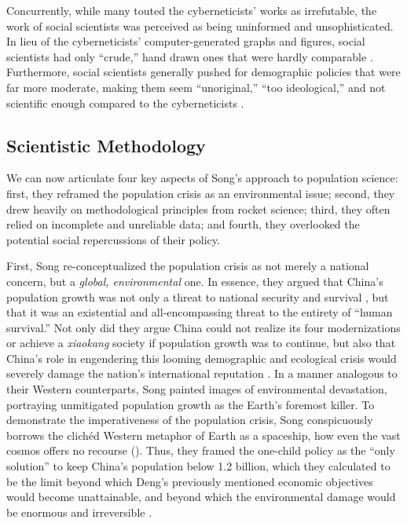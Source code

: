 Concurrently, while many touted the cyberneticists’ works as irrefutable, the work of social scientists was perceived as being uninformed and unsophisticated. In lieu of the cyberneticists’ computer-generated graphs and figures, social scientists had only “crude,” hand drawn ones that were hardly comparable \autocite[p.\ 209]{Greenhalgh2008JustOneChild}. Furthermore, social scientists generally pushed for demographic policies that were far more moderate, making them seem “unoriginal,” “too ideological,” and not scientific enough compared to the cyberneticists \autocite[p.\ 260]{Greenhalgh2008JustOneChild}. 

\subsection{Scientistic Methodology}

We can now articulate four key aspects of Song's approach to population science: first, they reframed the population crisis as an environmental issue; second, they drew heavily on methodological principles from rocket science; third, they often relied on incomplete and unreliable data; and fourth, they overlooked the potential social repercussions of their policy.

First, Song re-conceptualized the population crisis as not merely a national concern, but a \emph{global, environmental} one. In essence, they argued that China’s population growth was not only a threat to national security and survival \autocite[p.\ 153]{Greenhalgh2008JustOneChild}, but that it was an existential and all-encompassing threat to the entirety of “human survival.” Not only did they argue China could not realize its four modernizations or achieve a \emph{xiaokang} society if population growth was to continue, but also that China’s role in engendering this looming demographic and ecological crisis would severely damage the nation’s international reputation \autocite[p.\ 154]{Greenhalgh2008JustOneChild}. In a manner analogous to their Western counterparts, Song painted images of environmental devastation, portraying unmitigated population growth as the Earth's foremost killer. To demonstrate the imperativeness of the population crisis, Song conspicuously borrows the clichéd Western metaphor of Earth as a spaceship, how even the vast cosmos offers no recourse (\cites[p.\ 149]{Greenhalgh2008JustOneChild}[p.\ 21]{Ehrlich1971PopulationBomb}). Thus, they framed the one-child policy as the “only solution” to keep China’s population below 1.2 billion, which they calculated to be the limit beyond which Deng’s previously mentioned economic objectives would become unattainable, and beyond which the environmental damage would be enormous and irreversible \autocite[pp.\ 158, 240]{Greenhalgh2008JustOneChild}.

